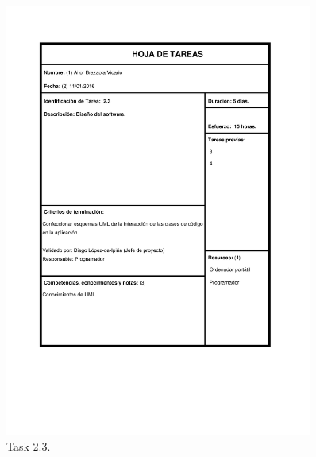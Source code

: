 \documentclass{DeustoFDP}
\begin{document}
\begin{figure}[H]
	\centering
	\includegraphics[width=0.9\textwidth]{fig/Tareas/23}
	\caption{Task 2.3.}
	\label{fig:t23}
\end{figure}
\end{document}
